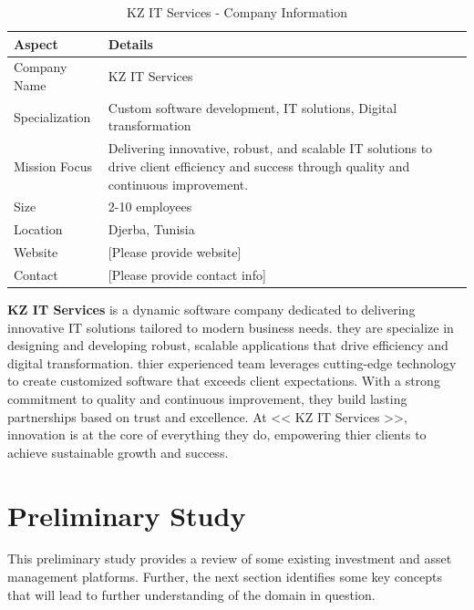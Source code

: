\newpage
\begin{table}[htbp]
    \centering
    \caption{KZ IT Services - Company Information}
    \label{tab:kz_it_services_info}
    \renewcommand{\arraystretch}{1.3}
    \begin{tabular}{|l|p{}|}
        \hline
        \rowcolor{primary!10}
        \textbf{Aspect} & \textbf{Details} \\
        \hline
        Company Name & KZ IT Services \\
        \hline
        \rowcolor{background!50}
        Specialization & Custom software development, IT solutions, Digital transformation \\
        \hline
        Mission Focus & Delivering innovative, robust, and scalable IT solutions to drive client efficiency and success through quality and continuous improvement. \\
        \hline
        \rowcolor{background!50}
        Size & 2-10 employees \\
        \hline
        \rowcolor{background!50}
        Location & Djerba, Tunisia \\
        \hline
        Website & [Please provide website] \\
        \hline
        \rowcolor{background!50}
        Contact & [Please provide contact info] \\
        \hline
    \end{tabular}
\end{table}

\textbf{\textcolor{primary}{KZ IT Services}} is a dynamic software company dedicated to delivering innovative IT solutions tailored to modern business needs. they are specialize in designing and developing robust, scalable applications that drive efficiency and digital transformation. thier experienced team leverages cutting-edge technology to create customized software that exceeds client expectations. With a strong commitment to quality and continuous improvement, they build lasting partnerships based on trust and excellence. At << KZ IT Services >>, innovation is at the core of everything they do, empowering thier clients to achieve sustainable growth and success.

\section{Preliminary Study}

This preliminary study provides a review of some existing investment and asset management platforms. Further, the next section identifies some key concepts that will lead to further understanding of the domain in question.

